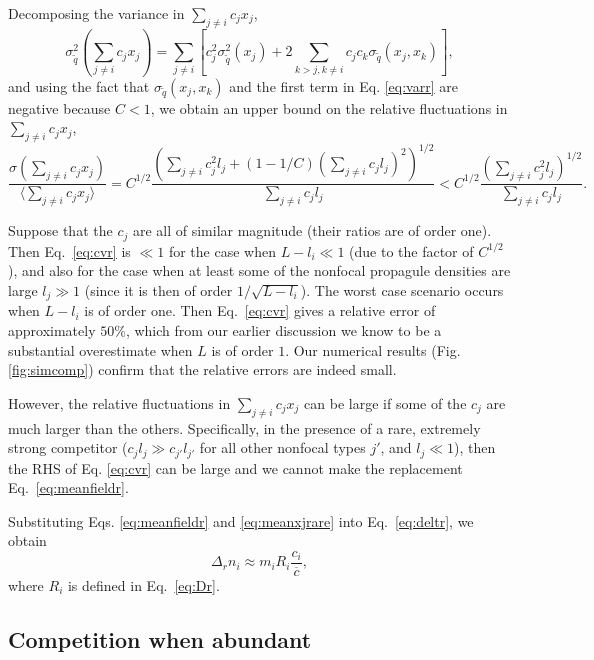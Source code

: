 \documentclass[11pt]{article}
\begin{document}
Decomposing the variance in $\sum_{j\neq i} c_j x_j$,
\begin{equation}
\sigma_{\tilde{q}}^2(\sum_{j\neq i} c_j x_j)=\sum_{j\neq i}\left[c_j^2\sigma_{\tilde{q}}^2(x_j)+2\sum_{k>j, k\neq i}c_j c_k\sigma_{\tilde{q}}(x_j,x_k)\right],\label{eq:vartotr}
\end{equation}
and using the fact that $\sigma_{\tilde{q}}(x_j,x_k)$ and the first term in Eq. \eqref{eq:varr} are negative because $C<1$, we obtain an upper bound on the relative fluctuations in $\sum_{j\neq i} c_j x_j$, 
\begin{equation}
\frac{\sigma(\sum_{j\neq i} c_j x_j)}{\langle\sum_{j\neq i} c_j x_j\rangle}=C^{1/2}\frac{\left(\sum_{j\neq i}c_j^2 l_j+(1-1/C)\left(\sum_{j\neq i}c_j l_j\right)^2 \right)^{1/2}}{\sum_{j\neq i}c_j l_j}<C^{1/2}\frac{\left(\sum_{j\neq i}c_j^2 l_j\right)^{1/2}}{\sum_{j\neq i}c_j l_j}. \label{eq:cvr}
\end{equation}

Suppose that the $c_j$ are all of similar magnitude (their ratios are of order one). Then Eq.~\eqref{eq:cvr} is $\ll 1$ for the case when $L-l_i \ll 1$ (due to the factor of $C^{1/2}$), and also for the case when at least some of the nonfocal propagule densities are large $l_j\gg 1$ (since it is then of order $1/\sqrt{L-l_i}$). The worst case scenario occurs when $L-l_i$ is of order one. Then Eq.~\eqref{eq:cvr} gives a relative error of approximately $50\%$, which from our earlier discussion we know to be a substantial overestimate when $L$ is of order $1$. Our numerical results (Fig. \ref{fig:simcomp}) confirm that the relative errors are indeed small.

However, the relative fluctuations in $\sum_{j\neq i} c_j x_j$ can be large if some of the $c_j$ are much larger than the others. Specifically, in the presence of a rare, extremely strong competitor ($c_j l_j\gg c_{j'} l_{j'}$ for all other nonfocal types $j'$, and $l_j\ll 1$), then the RHS of Eq. \eqref{eq:cvr} can be large and we cannot make the replacement Eq.~\eqref{eq:meanfieldr}. 

Substituting Eqs. \eqref{eq:meanfieldr} and \eqref{eq:meanxjrare} into Eq.~\eqref{eq:deltr}, we obtain
\begin{equation}
\Delta_r n_i\approx m_i R_i\frac{c_i}{\overline{c}}, \label{eq:deltrfinal}
\end{equation}
where $R_i$ is defined in Eq.~\eqref{eq:Dr}.

\subsection*{Competition when abundant}
\end{document}
